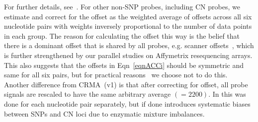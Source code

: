 \documentclass{bioinfo}
\begin{document}
For further details, see~\citet{BengtssonH_etal_2008}.  For other non-SNP probes, including CN probes, we estimate and correct for the offset as the weighted average of offsets across all six nucleotide pairs with weights inversely proportional to the number of data points in each group.  The reason for calculating the offset this way is the belief that there is a dominant offset that is shared by all probes, e.g. scanner offsets~\citep{BengtssonH_etal_2004}, which is further strengthened by our parallel studies on Affymetrix resequencing arrays.  This also suggests that the offsets in Eqn~\eqref{eqnACCi} should be symmetric and same for all six pairs, but for practical reasons~\citep{BengtssonH_etal_2008} we choose not to do this.
Another difference from CRMA~(v1) is that after correcting for offset, all probe signals are rescaled to have the same arbitrary average $(=2200)$.  In \citet{BengtssonH_etal_2008} this was done for each nucleotide pair separately, but if done introduces systematic biases between SNPs and CN loci due to enzymatic mixture imbalances.
\end{document}
